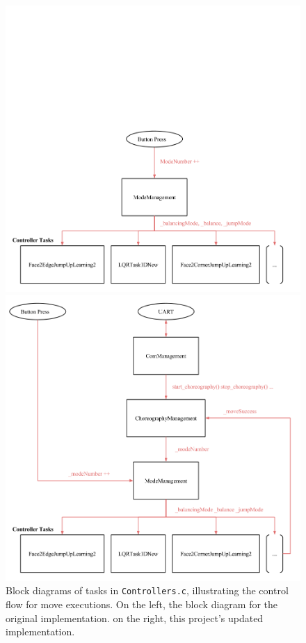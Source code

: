 \begin{figure}[ht]
  \begin{minipage}[t]{0.48\textwidth}
    \includegraphics[width = \textwidth]{img/Controllers.png}
  \end{minipage}
  \hfill
  \begin{minipage}[t]{0.48\textwidth}
    \includegraphics[width = \textwidth]{img/ControllersChoreography.png}
  \end{minipage}
  \caption{Block diagrams of tasks in \texttt{Controllers.c}, illustrating the control flow for move executions. On the left, the block diagram for the original implementation. on the right, this project's updated implementation.}
  \label{img:Controllers}
\end{figure}

